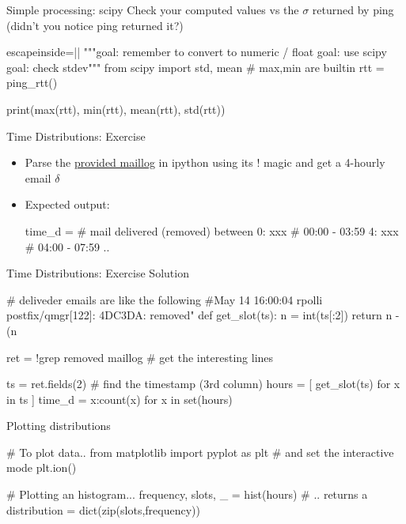 \begin{pyframe}{Simple processing: scipy}
Check your computed values vs the $\sigma$ returned by ping 
(didn't you notice ping returned it?) 
\begin{pycode*}{escapeinside=||}
"""goal: remember to convert to numeric / float
   goal: use scipy
   goal: check stdev"""
from scipy import std, mean # max,min are builtin
rtt = ping_rtt()

print(max(rtt), min(rtt), mean(rtt), std(rtt))

\end{pycode*}
\end{pyframe}

\begin{pyframe}{Time Distributions: Exercise}
\begin{itemize}
\item Parse the \href{https://github.com/ioggstream/python-course/blob/master/python-for-sysadmin/data/maillog}{provided maillog} in ipython using its ! magic and get a 4-hourly email $\delta$
\item Expected output: 
\begin{pycode}
time_d = {  # mail delivered (removed) between
    0: xxx  #  00:00 - 03:59
    4: xxx  #  04:00 - 07:59
    ..
    }
\end{pycode}
\end{itemize}
\end{pyframe}
 
\iftrue
\begin{pyframe}{Time Distributions: Exercise Solution}
\begin{pycode}
# deliveder emails are like the following 
#May 14 16:00:04 rpolli postfix/qmgr[122]: 4DC3DA: removed"
def get_slot(ts):
    n = int(ts[:2])
    return n - (n%
    
ret = !grep removed maillog # get the interesting lines

ts = ret.fields(2) # find the timestamp (3rd column)
hours = [ get_slot(ts)  for x in ts ]
time_d = {x:count(x) for x in set(hours)}
\end{pycode}
\end{pyframe}

\fi 

\begin{pyframe}{Plotting distributions}
\begin{pycode}
# To plot data..
from matplotlib import pyplot as plt
# and set the interactive mode
plt.ion()

# Plotting an histogram... 
frequency, slots, _ = hist(hours)
# .. returns a 
distribution = dict(zip(slots,frequency))
\end{pycode}
\end{pyframe}

